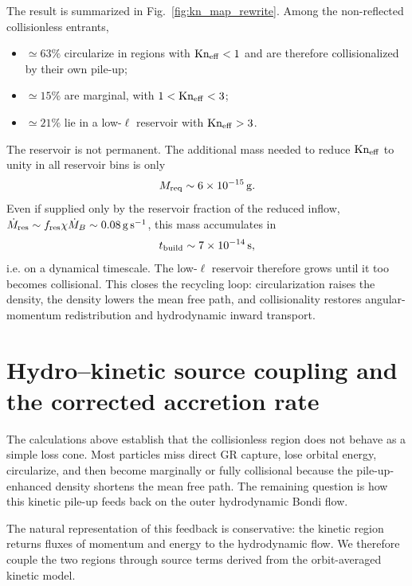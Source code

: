 \documentclass[12pt]{article}
\newcommand{\Mdot}{\dot{M}}
\newcommand{\MdotB}{\dot{M}_B}
\newcommand{\Kn}{\mathrm{Kn}}
\begin{document}
The result is summarized in Fig.~\ref{fig:kn_map_rewrite}. Among the
non-reflected collisionless entrants,
\begin{itemize}
  \item $\simeq63\%$ circularize in regions with $\Kn_{\rm eff}<1$ and
  are therefore collisionalized by their own pile-up;
  \item $\simeq15\%$ are marginal, with $1<\Kn_{\rm eff}<3$;
  \item $\simeq21\%$ lie in a low-$\ell$ reservoir with
  $\Kn_{\rm eff}>3$.
\end{itemize}
The reservoir is not permanent. The additional mass needed to reduce
$\Kn_{\rm eff}$ to unity in all reservoir bins is only
\begin{equation}
  M_{\rm req}\sim6\times10^{-15}\,{\rm g}.
\end{equation}
Even if supplied only by the reservoir fraction of the reduced inflow,
$\Mdot_{\rm res}\sim f_{\rm res}\chi\MdotB\sim0.08\,{\rm g\,s^{-1}}$,
this mass accumulates in
\begin{equation}
  t_{\rm build}\sim7\times10^{-14}\,{\rm s},
\end{equation}
i.e. on a dynamical timescale. The low-$\ell$ reservoir therefore grows
until it too becomes collisional. This closes the recycling loop:
circularization raises the density, the density lowers the mean free
path, and collisionality restores angular-momentum redistribution and
hydrodynamic inward transport.

\section{Hydro--kinetic source coupling and the corrected accretion rate}
\label{sec:stage3b}

The calculations above establish that the collisionless region does
not behave as a simple loss cone. Most particles miss direct GR
capture, lose orbital energy, circularize, and then become marginally
or fully collisional because the pile-up-enhanced density shortens the
mean free path. The remaining question is how this kinetic pile-up
feeds back on the outer hydrodynamic Bondi flow.

The natural representation of this feedback is conservative: the
kinetic region returns fluxes of momentum and energy to the
hydrodynamic flow. We therefore couple the two regions through source
terms derived from the orbit-averaged kinetic model.
\end{document}
